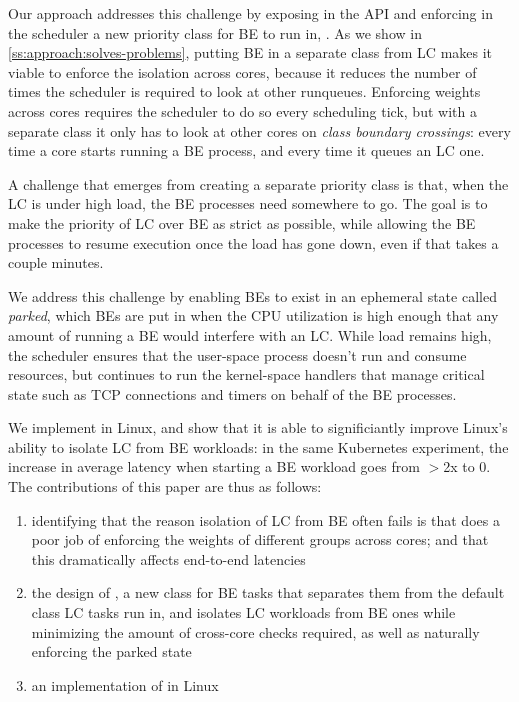Our approach addresses this challenge by exposing in the API and enforcing in
the scheduler a new priority class for BE to run in, \beclass{}. As we show in
\autoref{ss:approach:solves-problems}, putting BE in a separate class from LC
makes it viable to enforce the isolation across cores, because it reduces the
number of times the scheduler is required to look at other runqueues. Enforcing
weights across cores requires the scheduler to do so every scheduling tick, but
with a separate class it only has to look at other cores on \textit{class
boundary crossings}: every time a core starts running a BE process, and every
time it queues an LC one.

A challenge that emerges from creating a separate priority class is that, when
the LC is under high load, the BE processes need somewhere to go. The goal is to
make the priority of LC over BE as strict as possible, while allowing the BE
processes to resume execution once the load has gone down, even if that takes a
couple minutes.

We address this challenge by enabling BEs to exist in an ephemeral state called
\textit{parked}, which BEs are put in when the CPU utilization is high enough
that any amount of running a BE would interfere with an LC. While load remains
high, the scheduler ensures that the user-space process doesn't run and consume
resources, but continues to run the kernel-space handlers that manage critical
state such as TCP connections and timers on behalf of the BE processes. 

We implement \beclass{} in Linux, and show that it is able to significiantly
improve Linux's ability to isolate LC from BE workloads: in the same Kubernetes
experiment, the increase in average latency when starting a BE workload goes
from $>$2x to 0. The contributions of this paper are thus as follows: 
\begin{enumerate}
    \item identifying that the reason isolation of LC from BE often fails is that
    \cgroups{} does a poor job of enforcing the weights of different groups
    across cores; and that this dramatically affects end-to-end latencies
    \item the design of \beclass{}, a new class for BE tasks that separates
    them from the default class LC tasks run in, and isolates LC workloads from
    BE ones while minimizing the amount of cross-core checks required, as well as
    naturally enforcing the parked state
    \item an implementation of \beclass{} in Linux
\end{enumerate}
